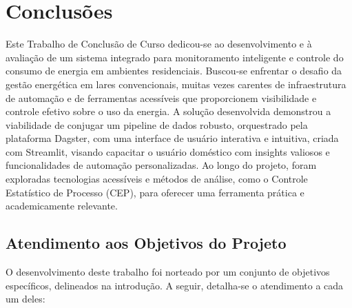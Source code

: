\chapter{Conclusões}
\label{sec:conclusoes}

Este Trabalho de Conclusão de Curso dedicou-se ao desenvolvimento e à avaliação de um sistema integrado para monitoramento inteligente e controle do consumo de energia em ambientes residenciais. Buscou-se enfrentar o desafio da gestão energética em lares convencionais, muitas vezes carentes de infraestrutura de automação e de ferramentas acessíveis que proporcionem visibilidade e controle efetivo sobre o uso da energia. A solução desenvolvida demonstrou a viabilidade de conjugar um pipeline de dados robusto, orquestrado pela plataforma Dagster, com uma interface de usuário interativa e intuitiva, criada com Streamlit, visando capacitar o usuário doméstico com insights valiosos e funcionalidades de automação personalizadas. Ao longo do projeto, foram exploradas tecnologias acessíveis e métodos de análise, como o Controle Estatístico de Processo (CEP), para oferecer uma ferramenta prática e academicamente relevante.

\section{Atendimento aos Objetivos do Projeto}
\label{sec:atendimento_objetivos}

O desenvolvimento deste trabalho foi norteado por um conjunto de objetivos específicos, delineados na introdução. A seguir, detalha-se o atendimento a cada um deles:

